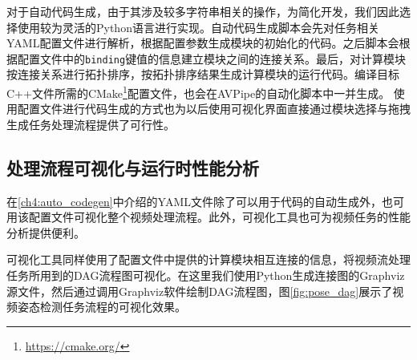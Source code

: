 对于自动代码生成，由于其涉及较多字符串相关的操作，为简化开发，我们因此选择使用较为灵活的Python语言进行实现。自动代码生成脚本会先对任务相关YAML配置文件进行解析，根据配置参数生成模块的初始化的代码。之后脚本会根据配置文件中的\texttt{binding}键值的信息建立模块之间的连接关系。最后，对计算模块按连接关系进行拓扑排序，按拓扑排序结果生成计算模块的运行代码。编译目标C++文件所需的CMake\footnote{\url{https://cmake.org/}}配置文件，也会在AVPipe的自动化脚本中一并生成。
使用配置文件进行代码生成的方式也为以后使用可视化界面直接通过模块选择与拖拽生成任务处理流程提供了可行性。

\subsection{处理流程可视化与运行时性能分析}
在\ref{ch4:auto_codegen}中介绍的YAML文件除了可以用于代码的自动生成外，也可用该配置文件可视化整个视频处理流程。此外，可视化工具也可为视频任务的性能分析提供便利。\par

可视化工具同样使用了配置文件中提供的计算模块相互连接的信息，将视频流处理任务所用到的DAG流程图可视化。在这里我们使用Python生成连接图的Graphviz\cite{Gansner00anopen}源文件，然后通过调用Graphviz软件绘制DAG流程图，图\ref{fig:pose_dag}展示了视频姿态检测任务流程的可视化效果。\par


